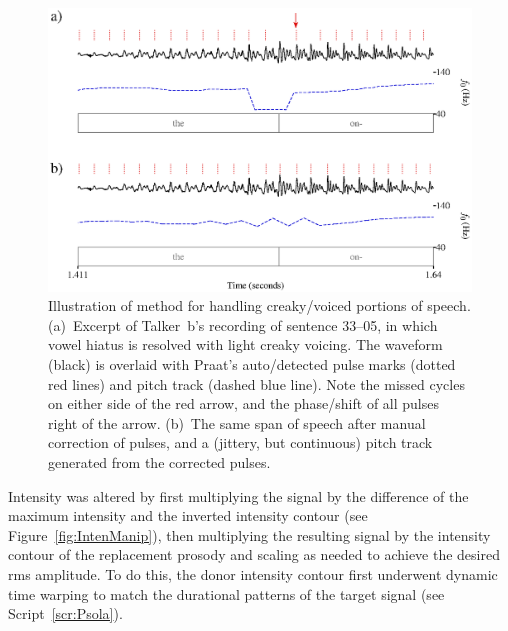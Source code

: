 \begin{figure}
	\begin{centering}
	\includegraphics{figures/creakJitterShimmer/creakJitterShimmer.eps}
	\caption[Handling of creaky voicing in resynthesis]{Illustration of method for handling creaky\-/voiced portions of speech.  (a)~Excerpt of Talker~\ac{b}’s recording of sentence 33–05, in which vowel hiatus is resolved with light creaky voicing.  The waveform (black) is overlaid with Praat’s auto\-/detected pulse marks (dotted red lines) and pitch track (dashed blue line).  Note the missed cycles on either side of the red arrow, and the phase\-/shift of all pulses right of the arrow.  (b)~The same span of speech after manual correction of pulses, and a (jittery, but continuous) pitch track generated from the corrected pulses.\label{fig:JitShim}}
	\end{centering}
\end{figure}

Intensity was altered by first multiplying the signal by the difference of the maximum intensity and the inverted intensity contour (see Figure~\ref{fig:IntenManip}), then multiplying the resulting signal by the intensity contour of the replacement prosody and scaling as needed to achieve the desired \ac{rms} amplitude.  To do this, the donor intensity contour first underwent dynamic time warping to match the durational patterns of the target signal (see Script~\ref{scr:Psola}).

